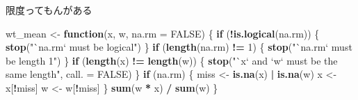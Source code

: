 \documentclass[ignorenonframetext,]{beamer}
\newenvironment{Shaded}{\begin{snugshade}}{\end{snugshade}}
\newcommand{\KeywordTok}[1]{\textcolor[rgb]{0.13,0.29,0.53}{\textbf{#1}}}
\newcommand{\DataTypeTok}[1]{\textcolor[rgb]{0.13,0.29,0.53}{#1}}
\newcommand{\DecValTok}[1]{\textcolor[rgb]{0.00,0.00,0.81}{#1}}
\newcommand{\StringTok}[1]{\textcolor[rgb]{0.31,0.60,0.02}{#1}}
\newcommand{\OtherTok}[1]{\textcolor[rgb]{0.56,0.35,0.01}{#1}}
\newcommand{\ControlFlowTok}[1]{\textcolor[rgb]{0.13,0.29,0.53}{\textbf{#1}}}
\newcommand{\OperatorTok}[1]{\textcolor[rgb]{0.81,0.36,0.00}{\textbf{#1}}}
\newcommand{\NormalTok}[1]{#1}
\begin{document}
\begin{frame}[fragile]{限度ってもんがある}

\begin{Shaded}
\begin{Highlighting}[]
\NormalTok{wt_mean <-}\StringTok{ }\ControlFlowTok{function}\NormalTok{(x, w, }\DataTypeTok{na.rm =} \OtherTok{FALSE}\NormalTok{) \{}
  \ControlFlowTok{if}\NormalTok{ (}\OperatorTok{!}\KeywordTok{is.logical}\NormalTok{(na.rm)) \{}
    \KeywordTok{stop}\NormalTok{(}\StringTok{"`na.rm` must be logical"}\NormalTok{)}
\NormalTok{  \}}
  \ControlFlowTok{if}\NormalTok{ (}\KeywordTok{length}\NormalTok{(na.rm) }\OperatorTok{!=}\StringTok{ }\DecValTok{1}\NormalTok{) \{}
    \KeywordTok{stop}\NormalTok{(}\StringTok{"`na.rm` must be length 1"}\NormalTok{)}
\NormalTok{  \}}
  \ControlFlowTok{if}\NormalTok{ (}\KeywordTok{length}\NormalTok{(x) }\OperatorTok{!=}\StringTok{ }\KeywordTok{length}\NormalTok{(w)) \{}
    \KeywordTok{stop}\NormalTok{(}\StringTok{"`x` and `w` must be the same length"}\NormalTok{, }\DataTypeTok{call. =} \OtherTok{FALSE}\NormalTok{)}
\NormalTok{  \} }
  \ControlFlowTok{if}\NormalTok{ (na.rm) \{}
\NormalTok{    miss <-}\StringTok{ }\KeywordTok{is.na}\NormalTok{(x) }\OperatorTok{|}\StringTok{ }\KeywordTok{is.na}\NormalTok{(w)}
\NormalTok{    x <-}\StringTok{ }\NormalTok{x[}\OperatorTok{!}\NormalTok{miss]}
\NormalTok{    w <-}\StringTok{ }\NormalTok{w[}\OperatorTok{!}\NormalTok{miss]}
\NormalTok{  \}}
  \KeywordTok{sum}\NormalTok{(w }\OperatorTok{*}\StringTok{ }\NormalTok{x) }\OperatorTok{/}\StringTok{ }\KeywordTok{sum}\NormalTok{(w)}
\NormalTok{\}}
\end{Highlighting}
\end{Shaded}

\end{frame}
\end{document}
